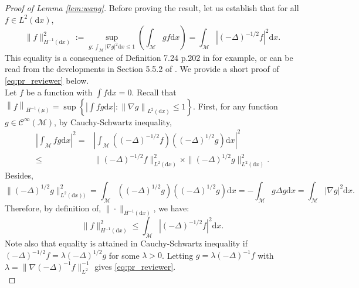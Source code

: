 \documentclass[10pt,a4paper]{article}
\newcommand\cM{\mathcal{M}}
\newcommand\dd{\mathrm{d}}
\newcommand{\ABS}[1]{{{\left| #1 \right|}}} %
\newcommand{\BRA}[1]{{{\left\{#1\right\}}}} %
\newcommand{\NRM}[1]{{{\left\| #1\right\|}}} %
\newcommand{\PAR}[1]{{{\left(#1\right)}}} %
\begin{document}
\begin{proof}[Proof of Lemma \ref{lem:wang}] 
Before proving the result, let us establish that for all $f \in L^2(\dd x)$,  
\begin{equation}\label{eq:pr_reviewer}\|f\|_{H^{-1}(\dd x)}^2:=\sup_{g:  \int_\cM | \nabla g|^2 \dd x \le 1} \PAR{ \int_\cM g f \dd x } =\int_\mathcal{M} |(-\Delta)^{-1/2}f|^2 \mathrm{d}x.
\end{equation}
This equality is a consequence of Definition 7.24 p.202 in \cite{rudin1991} for example, or can be read from the developments in  Section 5.5.2 of \cite{santambrogio2015}. We provide a short proof of \eqref{eq:pr_reviewer} below.\\

Let $f$ be a function with $\int f\dd x=0$. 
          Recall that $\NRM{f}_{H^{-1}(\mu)}=\sup\BRA{\ABS{\int fg\dd x}:\NRM{\nabla g}_{L^2(\dd x)}\le 1}$. 
              First, for any function $g \in \mathcal{C}^\infty(\cM)$, by Cauchy-Schwartz inequality,
              \begin{align*}
                       \left| \int_\cM fg \dd x \right|^2  =  & \left| \int_\cM ( (-\Delta)^{-1/2}f) ( (-\Delta)^{1/2}g)  \dd x\right|^2 \\
                  \le  &  \| (-\Delta)^{-1/2}f\|^2_{L^2(\dd x)} \times \| (-\Delta)^{1/2}g\|^2_{L^2(\dd x)}.
              \end{align*}
              Besides,
              $$
                  \| (-\Delta)^{1/2}g\|^2_{L^2(\dd x))} = \int_\mathcal{M}  ((-\Delta)^{1/2}g)((-\Delta)^{1/2}g)\dd x = -\int_\cM g \Delta g\dd x = \int_\cM |\nabla g|^2\dd x .
              $$
              Therefore, by definition of, $\| \cdot\|_{H^{-1}(\dd x)}$, we have:
              \begin{equation*}
                  \|f\|_{H^{-1}(\dd x)}^2 \le \int_\mathcal{M} |(-\Delta)^{-1/2}f|^2 \mathrm{d}x. 
              \end{equation*}
Note also that equality is attained in Cauchy-Schwartz inequality if $(-\Delta)^{-1/2}f = \lambda (-\Delta)^{1/2} g$ for some $\lambda>0$. Letting $g= \lambda (-\Delta)^{-1}f$ with $\lambda = \|\nabla (-\Delta)^{-1}f\|_{L^2}^{-1}$ gives \eqref{eq:pr_reviewer}.\\


\end{proof}
\end{document}
